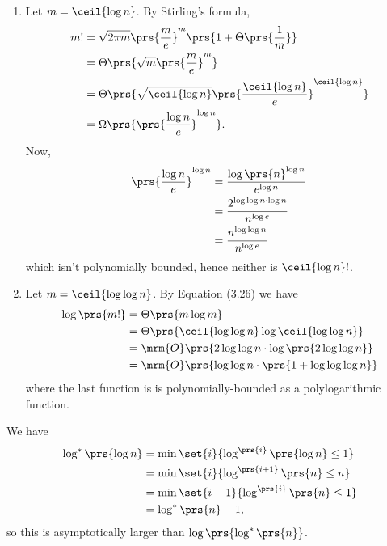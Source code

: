 \documentclass[oneside]{scrbook}
\theoremstyle{definition}
\begin{document}
\begin{exercise}
    \begin{enumerate}
    \item Let $m = \ceil{\log n}$. By Stirling's formula,
    \begin{align*}
    m! &=
    \sqrt{2 \pi m} \prs{\frac{m}{e}}^{m} \prs{1 + \Theta\prs{\frac{1}{m}}}
    \\&=
    \Theta\prs{\sqrt{m} \prs{\frac{m}{e}}^m}
    \\&=
    \Theta\prs{\sqrt{\ceil{\log n}} \prs{\frac{\ceil{\log n}}{e}}^{\ceil{\log n}}}
    \\&= \Omega\prs{\prs{\frac{\log n}{e}}^{\log n}} \text{.}
    \end{align*}
    Now,
    \begin{align*}
    \prs{\frac{\log n}{e}}^{\log n} &= \frac{\log \prs{n} ^{\log n}}{e^{\log n}}
    \\&= \frac{2^{\log \log n \cdot \log n}}{n^{\log e}}
    \\&= \frac{n^{\log \log n}}{n^{\log e}}
    \end{align*}
    which isn't polynomially bounded, hence neither is $\ceil{\log n}!$.
    
    \item
    Let $m = \ceil{\log \log n}$. By Equation (3.26) we have
    \begin{align*}
    \log \prs{m!} &= \Theta\prs{m \log m}
    \\&= \Theta\prs{\ceil{\log \log n} \log \ceil{\log \log n}}
    \\&= \mrm{O}\prs{2 \log \log n \cdot \log\prs{2 \log \log n}}
    \\&= \mrm{O}\prs{\log \log n \cdot \prs{1 + \log \log \log n}}
    \end{align*}
    where the last function is is polynomially-bounded as a polylogarithmic function.
    \end{enumerate}    
\end{exercise}

\begin{exercise}\label{exercise:log*log}
We have
\begin{align*}
\log^*\prs{\log n} &= \min\set{i}{\log^{\prs{i}}\prs{\log n} \leq 1}
\\&= \min\set{i}{\log^{\prs{i+1}}\prs{n} \leq n}
\\&= \min\set{i-1}{\log^{\prs{i}}\prs{n} \leq 1}
\\&= \log^*\prs{n} - 1 \text{,}
\end{align*}
so this is asymptotically larger than $\log\prs{\log^*\prs{n}}$.
\end{exercise}
\end{document}
